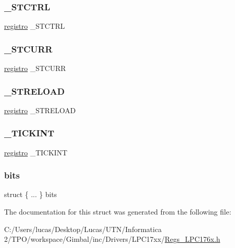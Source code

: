\subsubsection{\texorpdfstring{\_STCTRL}{\_STCTRL}}
{\footnotesize\ttfamily \mbox{\hyperlink{_regs___l_p_c176x_8h_a7834e059ad90540ce735ec41183ff05a}{registro}} \+\_\+\+S\+T\+C\+T\+RL}

\mbox{\label{structsystick__t_ac51b6f2e44bb5b23e87b49143082786c}} 
\subsubsection{\texorpdfstring{\_STCURR}{\_STCURR}}
{\footnotesize\ttfamily \mbox{\hyperlink{_regs___l_p_c176x_8h_a7834e059ad90540ce735ec41183ff05a}{registro}} \+\_\+\+S\+T\+C\+U\+RR}

\mbox{\label{structsystick__t_a279043cdd61dfe4d53d83afe4b7ec141}} 
\subsubsection{\texorpdfstring{\_STRELOAD}{\_STRELOAD}}
{\footnotesize\ttfamily \mbox{\hyperlink{_regs___l_p_c176x_8h_a7834e059ad90540ce735ec41183ff05a}{registro}} \+\_\+\+S\+T\+R\+E\+L\+O\+AD}

\mbox{\label{structsystick__t_af95dd18e82eea4994a1fcdfbed315e97}} 
\subsubsection{\texorpdfstring{\_TICKINT}{\_TICKINT}}
{\footnotesize\ttfamily \mbox{\hyperlink{_regs___l_p_c176x_8h_a7834e059ad90540ce735ec41183ff05a}{registro}} \+\_\+\+T\+I\+C\+K\+I\+NT}

\mbox{\label{structsystick__t_af89b228cefdf85bf13b72f7c975da4d1}} 
\subsubsection{\texorpdfstring{bits}{bits}}
{\footnotesize\ttfamily struct \{ ... \}  bits}



The documentation for this struct was generated from the following file\+:\begin{DoxyCompactItemize}
\item 
C\+:/\+Users/lucas/\+Desktop/\+Lucas/\+U\+T\+N/\+Informatica 2/\+T\+P\+O/workspace/\+Gimbal/inc/\+Drivers/\+L\+P\+C17xx/\mbox{\hyperlink{_regs___l_p_c176x_8h}{Regs\+\_\+\+L\+P\+C176x.\+h}}\end{DoxyCompactItemize}
